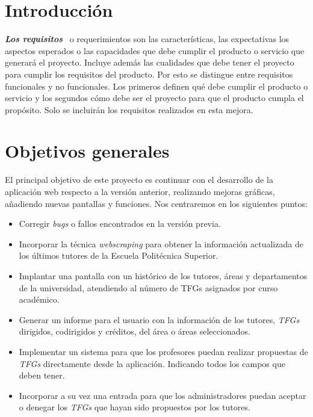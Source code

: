 
\section{Introducción}

\textbf{\textit{Los requisitos}}~\cite{Requisito} o requerimientos son las características, las expectativas los aspectos esperados o las capacidades que debe cumplir el producto o servicio que generará el proyecto. Incluye además las cualidades que debe tener el proyecto para cumplir los requisitos del producto. Por esto se distingue entre requisitos funcionales y no funcionales. Los primeros definen qué debe cumplir el producto o servicio y los segundos cómo debe ser el proyecto para que el producto cumpla el propósito.
Solo se incluirán los requisitos realizados en esta mejora.

\section{Objetivos generales}
El principal objetivo de este proyecto es continuar con el desarrollo de la aplicación web respecto a la versión anterior, realizando mejoras gráficas, añadiendo nuevas pantallas y funciones.
Nos centraremos en los siguientes puntos:
\begin{itemize}
	\item Corregir \emph{bugs} o fallos encontrados en la versión previa.
	\item Incorporar la técnica \emph{webscraping} para obtener la información actualizada de los últimos tutores de la Escuela Politécnica Superior.
	\item Implantar una pantalla con un histórico de los tutores, áreas y departamentos de la universidad, atendiendo al número de TFGs asignados por curso académico. 
	\item Generar un informe para el usuario con la información de los tutores, \emph{TFGs} dirigidos, codirigidos y créditos, del área o áreas seleccionados.
	\item Implementar un sistema para que los profesores puedan realizar propuestas de \emph{TFGs} directamente desde la aplicación. Indicando todos los campos que deben tener. 
	\item Incorporar a su vez una entrada para que los administradores puedan aceptar o denegar los \emph{TFGs} que hayan sido propuestos por los tutores.
\end{itemize}

